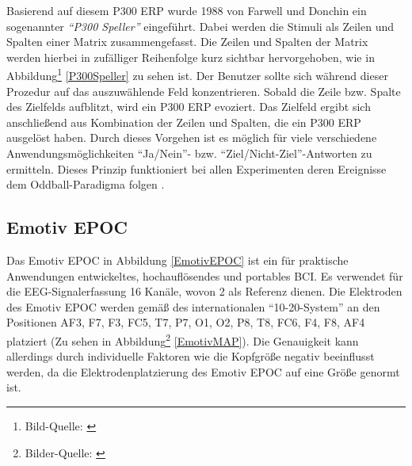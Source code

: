 Basierend auf diesem \ac{P300 ERP} wurde 1988 von Farwell und Donchin \cite{FarwellDonchin1988} ein sogenannter \textit{"`P300 Speller"'} eingeführt. 
Dabei werden die Stimuli als Zeilen und Spalten einer Matrix zusammengefasst. 
Die Zeilen und Spalten der Matrix werden hierbei in zufälliger Reihenfolge kurz sichtbar hervorgehoben, wie in Abbildung\footnote[1]{Bild-Quelle: \cite[S.300]{P300SpellerCompare}} \ref{P300Speller} zu sehen ist. 
Der Benutzer sollte sich während dieser Prozedur auf das auszuwählende Feld konzentrieren. 
Sobald die Zeile bzw. Spalte des Zielfelds aufblitzt, wird ein \acs{P300 ERP} evoziert. 
Das Zielfeld ergibt sich anschließend aus Kombination der Zeilen und Spalten, die ein \acs{P300 ERP} ausgelöst haben.
Durch dieses Vorgehen ist es möglich für viele verschiedene Anwendungsmöglichkeiten "`Ja/Nein"'- bzw. "`Ziel/Nicht-Ziel"'-Antworten zu ermitteln.
Dieses Prinzip funktioniert bei allen Experimenten deren Ereignisse dem Oddball-Paradigma folgen \cite[S.215ff]{wolpaw2012braincomputer}.\\



\subsection{Emotiv EPOC}
\vspace{0.3cm}

Das Emotiv EPOC \cite{Emotiv2014} in Abbildung \ref{EmotivEPOC} ist ein für praktische Anwendungen entwickeltes, hochauflösendes und portables \acs{BCI}.
Es verwendet für die \acs{EEG}-Signalerfassung 16 Kanäle, wovon 2 als Referenz dienen.
Die Elektroden des Emotiv EPOC werden gemäß des internationalen "`10-20-System"' \cite[S.370-375]{Jasp58} an den Positionen 
AF3, F7, F3, FC5, T7, P7, O1, O2, P8, T8, FC6, F4, F8, AF4 platziert (Zu sehen in Abbildung\footnote[1]{Bilder-Quelle: \cite{Emotiv2014}}
\ref{EmotivMAP}). 
Die Genauigkeit kann allerdings durch individuelle Faktoren wie die Kopfgröße negativ beeinflusst werden, da die Elektrodenplatzierung des Emotiv EPOC auf eine Größe genormt ist.\\

